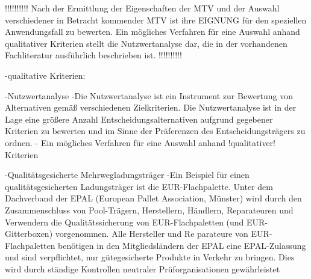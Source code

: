         
    !!!!!!!!!!    
    Nach der Ermittlung der Eigenschaften der MTV und der Auswahl verschiedener in Betracht kommender MTV ist ihre EIGNUNG für den speziellen Anwendungsfall zu bewerten. Ein mögliches Verfahren für eine Auswahl anhand qualitativer Kriterien stellt die Nutzwertanalyse dar, die in der vorhandenen Fachliteratur ausführlich beschrieben ist.
    !!!!!!!!!!        
    
    -qualitative Kriterien: 
    
    -Nutzwertanalyse
        -Die Nutzwertanalyse ist ein Instrument zur Bewertung von Alternativen gemäß verschiedenen Zielkriterien. Die Nutzwertanalyse ist in der Lage eine größere Anzahl Entscheidungsalternativen aufgrund gegebener Kriterien zu bewerten und im Sinne der Präferenzen des Entscheidungsträgers zu ordnen.
        - Ein mögliches Verfahren für eine Auswahl anhand !qualitativer! Kriterien
    
    -Qualitätsgesicherte Mehrwegladungsträger
        -Ein Beispiel für einen qualitätsgesicherten Ladungsträger ist die EUR-Flachpalette. Unter dem Dachverband der EPAL (European Pallet Association, Münster) wird durch den Zusammenschluss von Pool-Trägern, Herstellern, Händlern, Reparateuren und Verwendern die Qualitätssicherung von EUR-Flachpaletten (und EUR-Gitterboxen) vorgenommen.
        Alle Hersteller und Re parateure von EUR-Flachpaletten benötigen in den Mitgliedsländern der EPAL eine EPAL-Zulassung und sind verpflichtet, nur gütegesicherte Produkte in Verkehr zu bringen. Dies wird durch ständige Kontrollen neutraler Prüforganisationen gewährleistet
    
